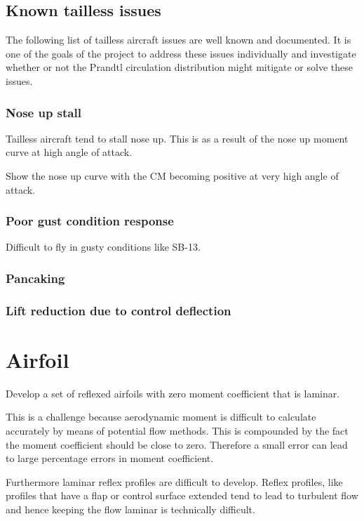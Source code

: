 \documentclass{report}
\begin{document}
\subsection{Known tailless issues}

The following list of tailless aircraft issues are well known and documented.  It is one of the goals of the project to address these issues individually and investigate whether or not the Prandtl circulation distribution might mitigate or solve these issues.

\subsubsection{Nose up stall}

Tailless aircraft tend to stall nose up.  This is as a result of the nose up moment curve at high angle of attack.

Show the nose up curve with the CM becoming positive at very high angle of attack.


\subsubsection{Poor gust condition response}

Difficult to fly in gusty conditions like SB-13.


\subsubsection{Pancaking}


\subsubsection{Lift reduction due to control deflection}


\section{Airfoil}

Develop a set of reflexed airfoils with zero moment coefficient that is laminar.

This is a challenge because aerodynamic moment is difficult to calculate accurately by means of potential flow methods.  This is compounded by the fact the moment coefficient should be close to zero.  Therefore a small error can lead to large percentage errors in moment coefficient.

Furthermore laminar reflex profiles are difficult to develop.  Reflex profiles, like profiles that have a flap or control surface extended tend to lead to turbulent flow and hence keeping the flow laminar is technically difficult.
\end{document}
